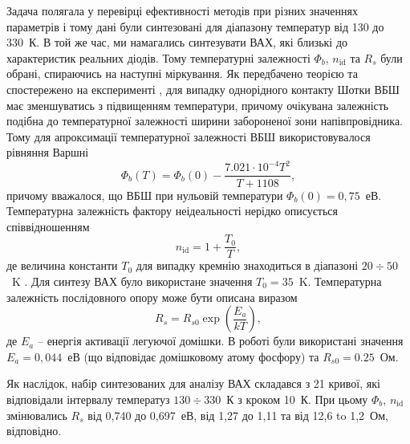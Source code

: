 \documentclass[a4paper,14pt,oneside,openany]{memoir}
\begin{document}
Задача полягала у перевірці ефективності методів при різних значеннях параметрів і тому дані були синтезовані для діапазону температур від 130 до 330~К.
В той же час, ми намагались синтезувати ВАХ, які близькі до характеристик реальних діодів.
Тому температурні залежності $\Phi_b$, $n_\mathrm{id}$ та $R_s$ були обрані, спираючись на наступні міркування.
Як передбачено теорією \cite{Rhoderick1988} та спостережено на експерименті \cite{Aboelfotoh,Zhua},
для випадку однорідного контакту Шотки ВБШ має зменшуватись з підвищенням температури, причому очікувана залежність подібна до температурної залежності ширини забороненої зони напівпровідника.
Тому для апроксимації температурної залежності ВБШ використовувалося рівняння Варшні \cite{SiEg2012}
\begin{equation}
\label{eqFbT}
\Phi_b(T) = \Phi_b(0) - \frac{7.021\cdot10^{-4} T^2}{T + 1108} ,
\end{equation}
причому вважалося, що ВБШ при нульовій температури $\Phi_b(0)=0,75$~еВ.
Температурна залежність фактору неідеальності нерідко описується співвідношенням
\begin{equation}
\label{eqnT}
n_\mathrm{id}=1+\frac{T_0}{T},
\end{equation}
де величина константи $T_0$ для випадку кремнію знаходиться в діапазоні $20\div50$~K \cite{T0:Lee,T0:McCafferty,T0:Saxena,Aboelfotoh}.
Для синтезу ВАХ було використане значення $T_0=35$~K.
Температурна залежність послідовного опору може бути описана виразом \cite{Sze1985,Rs:Meyaard,Rs:Kang}
\begin{equation}
\label{eqRsT}
R_s=R_{s0}\exp\left(\frac{E_a}{kT}\right),
\end{equation}
де $E_a$ -- енергія активації легуючої домішки.
В роботі були використані значення $E_a=0,044$~еВ (що відповідає домішковому атому фосфору) та $R_{s0}=0.25$~Ом.

Як наслідок, набір синтезованих для аналізу ВАХ складався з 21 кривої, які відповідали інтервалу температуз $130\div330$~К з кроком 10~К.
При цьому  $\Phi_b$, $n_\mathrm{id}$ змінювались $R_s$ від 0,740 до 0,697~еВ, від 1,27 до 1,11 та від 12,6 to 1,2~Ом, відповідно.
\end{document}
